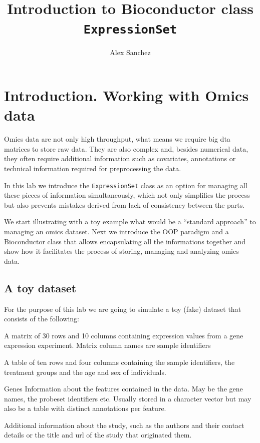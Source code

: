 \documentclass[a4paper]{article}\usepackage[]{graphicx}\usepackage[]{color}
\title{Introduction to Bioconductor class \texttt{ExpressionSet}}
\author{Alex Sanchez}
\begin{document}
\maketitle

\thispagestyle{empty}

\tableofcontents

\section{Introduction. Working with Omics data}

Omics data are not only high throughput, what means we require big dta matrices to store raw data. They are also complex and, besides numerical data, they often require additional information such as covariates, annotations or technical information required for preprocessing the data.

In this lab we introduce the \texttt{ExpressionSet} class as an option for managing all these pieces of information simultaneously, which not only simplifies the process but also prevents mistakes derived from lack of consistency between the parts.

We start illustrating with a toy example what would be a ``standard approach'' to managing an omics dataset. Next we introduce the OOP paradigm and a Bioconductor class that allows encapsulating all the informations together and show how it facilitates the process of storing, managing and analyzing omics data.

\subsection{A toy dataset}

For the purpose of this lab we are going to simulate a toy (fake) dataset that consists of the following:
\begin{description}
\item[Expression values] A matrix of 30 rows and 10 columns containing expression values from a gene expression experiment. Matrix column names are sample identifiers
\item[Covariates] A table of ten rows and four columns containing the sample identifiers, the treatment groups and the age and sex of individuals.
\item{Genes} Information about the features contained in the data. May be the gene names, the probeset identifiers etc. Usually stored in a character vector but may also be a table with distinct annotations per feature.
\item[Information about the experiment] Additional information about the study, such as the authors and their contact details or the title and url of the study that originated them.
\end{description}
\end{document}
